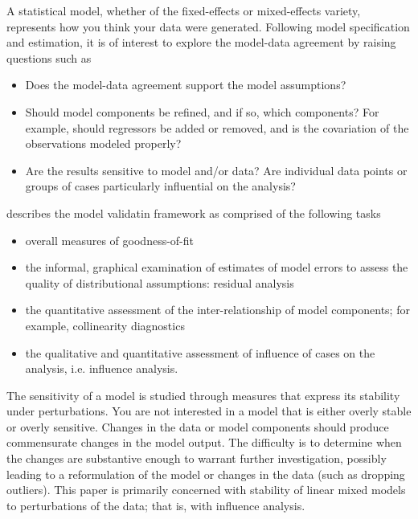 \documentclass[12pt, a4paper]{article}
\begin{document}
			
			A statistical model, whether of the fixed-effects or mixed-effects variety, represents how you think your data
			were generated. Following model specification and estimation, it is of interest to explore the model-data
			agreement by raising questions such as
			\begin{itemize}
				\item Does the model-data agreement support the model assumptions?
				\item Should model components be refined, and if so, which components? For example, should regressors
				be added or removed, and is the covariation of the observations modeled properly?
				\item Are the results sensitive to model and/or data? Are individual data points or groups of cases particularly
				influential on the analysis?
			\end{itemize}

			
			\citet{schab} describes the model validatin framework as comprised of the following tasks
			
			\begin{itemize}
				\item  overall measures of goodness-of-fit
				\item the informal, graphical examination of estimates of model errors to assess the quality of distributional
				assumptions: residual analysis
				
				
				\item the quantitative assessment of the inter-relationship of model components; for example, collinearity 	diagnostics
				\item the qualitative and quantitative assessment of influence of cases on the analysis, i.e. influence analysis.
			\end{itemize}
			
			The sensitivity of a model is studied through measures that express its stability under perturbations. You
			are not interested in a model that is either overly stable or overly sensitive. Changes in the data or model
			components should produce commensurate changes in the model output. The difficulty is to determine
			when the changes are substantive enough to warrant further investigation, possibly leading to a reformulation
			of the model or changes in the data (such as dropping outliers). This paper is primarily concerned
			with stability of linear mixed models to perturbations of the data; that is, with influence analysis. 
\end{document}
